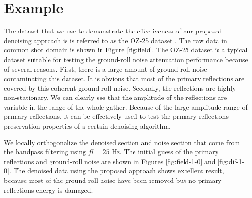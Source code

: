 \section{Example}
The dataset that we use to demonstrate the effectiveness of our proposed denoising approach is  is referred to as the OZ-25 dataset \cite{carson2006}.  The raw data in common shot domain is shown in Figure \ref{fig:field}.  The OZ-25 dataset is a typical dataset suitable for testing the ground-roll noise attenuation performance because of several reasons. First,  there is a large amount of ground-roll noise contaminating this dataset. It is obvious that most of the primary reflections are covered by this coherent ground-roll noise. Secondly, the reflections are highly non-stationary. We can clearly see that the amplitude of the reflections are variable in the range of the whole gather. Because of the large amplitude range of primary reflections, it can be effectively used to test the primary reflections preservation properties of a certain denoising algorithm.   

 We locally orthogonalize the denoised section and noise section that come from the bandpass filtering using $fl=25$ Hz. The initial guess of the primary reflections and ground-roll noise are shown in Figures \ref{fig:field-1-0} and \ref{fig:dif-1-0}.  The denoised data using the proposed approach shows excellent result, because most of the ground-roll noise have been removed but no primary reflections energy is damaged. 


